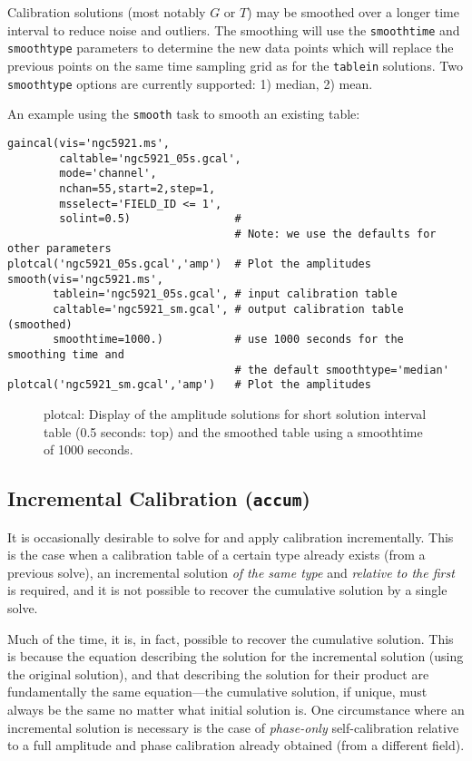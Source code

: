 Calibration solutions (most notably $G$ or $T$) may be smoothed over a
longer time interval to reduce noise and outliers. The smoothing will
use the {\tt smoothtime} and {\tt smoothtype} parameters to determine
the new data points which will replace the previous points on the same
time sampling grid as for the {\tt tablein} solutions. Two {\tt
smoothtype} options are currently supported: 1) median, 2) mean.


An example using the {\tt smooth} task to smooth an existing table:

\small
\begin{verbatim}
gaincal(vis='ngc5921.ms',
        caltable='ngc5921_05s.gcal',
        mode='channel',
        nchan=55,start=2,step=1,
        msselect='FIELD_ID <= 1',
        solint=0.5)                #
                                   # Note: we use the defaults for other parameters
plotcal('ngc5921_05s.gcal','amp')  # Plot the amplitudes
smooth(vis='ngc5921.ms',
       tablein='ngc5921_05s.gcal', # input calibration table
       caltable='ngc5921_sm.gcal', # output calibration table (smoothed)
       smoothtime=1000.)           # use 1000 seconds for the smoothing time and
                                   # the default smoothtype='median'
plotcal('ngc5921_sm.gcal','amp')   # Plot the amplitudes
\end{verbatim}
\normalsize

\begin{figure}[h!]
\caption{\label{fig:plotcal_smooth} plotcal: Display of the amplitude
  solutions for short solution interval table (0.5 seconds: top) and
  the smoothed table using a smoothtime of 1000 seconds. }
\hrulefill
\end{figure}


\subsection{Incremental Calibration ({\tt accum})}
\label{subsection:synth.cal.accum}

It is occasionally desirable to solve for and apply calibration
incrementally.  This is the case when a calibration table of a certain
type already exists (from a previous solve), an incremental solution
{\it of the same type} and {\it relative to the first} is required,
and it is not possible to recover the cumulative solution by a single
solve.

Much of the time, it is, in fact, possible to recover the cumulative
solution. This is because the equation describing the solution for the
incremental solution (using the original solution), and that describing
the solution for their product are fundamentally the same equation---the
cumulative solution, if unique, must always be the same no matter what
initial solution is.  One circumstance where an incremental solution is
necessary is the case of {\it phase-only} self-calibration relative to a
full amplitude and phase calibration already obtained (from a different
field).

